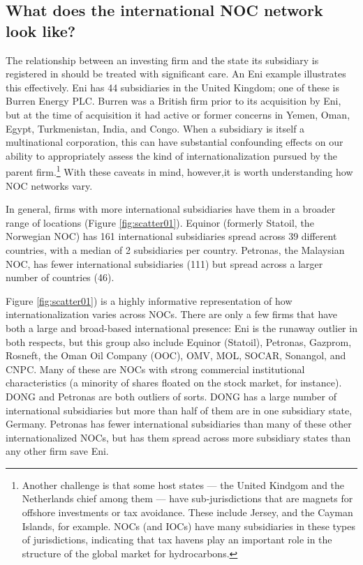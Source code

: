 \documentclass[11pt,]{book}
\begin{document}
\hypertarget{network01}{%
\subsection{What does the international NOC network look like?}\label{network01}}

The relationship between an investing firm and the state its subsidiary is registered in should be treated with significant care. An Eni example illustrates this effectively. Eni has 44 subsidiaries in the United Kingdom; one of these is Burren Energy PLC. Burren was a British firm prior to its acquisition by Eni, but at the time of acquisition it had active or former concerns in Yemen, Oman, Egypt, Turkmenistan, India, and Congo. When a subsidiary is itself a multinational corporation, this can have substantial confounding effects on our ability to appropriately assess the kind of internationalization pursued by the parent firm.\footnote{Another challenge is that some host states --- the United Kindgom and the Netherlands chief among them --- have sub-jurisdictions that are magnets for offshore investments or tax avoidance. These include Jersey, and the Cayman Islands, for example. NOCs (and IOCs) have many subsidiaries in these types of jurisdictions, indicating that tax havens play an important role in the structure of the global market for hydrocarbons.} With these caveats in mind, however,it is worth understanding how NOC networks vary.

In general, firms with more international subsidiaries have them in a broader range of locations (Figure \ref{fig:scatter01}). Equinor (formerly Statoil, the Norwegian NOC) has 161 international subsidiaries spread across 39 different countries, with a median of 2 subsidiaries per country. Petronas, the Malaysian NOC, has fewer international subsidiaries (111) but spread across a larger number of countries (46).

Figure \ref{fig:scatter01}) is a highly informative representation of how internationalization varies across NOCs. There are only a few firms that have both a large and broad-based international presence: Eni is the runaway outlier in both respects, but this group also include Equinor (Statoil), Petronas, Gazprom, Rosneft, the Oman Oil Company (OOC), OMV, MOL, SOCAR, Sonangol, and CNPC. Many of these are NOCs with strong commercial institutional characteristics (a minority of shares floated on the stock market, for instance). DONG and Petronas are both outliers of sorts. DONG has a large number of international subsidiaries but more than half of them are in one subsidiary state, Germany. Petronas has fewer international subsidiaries than many of these other internationalized NOCs, but has them spread across more subsidiary states than any other firm save Eni.
\end{document}
